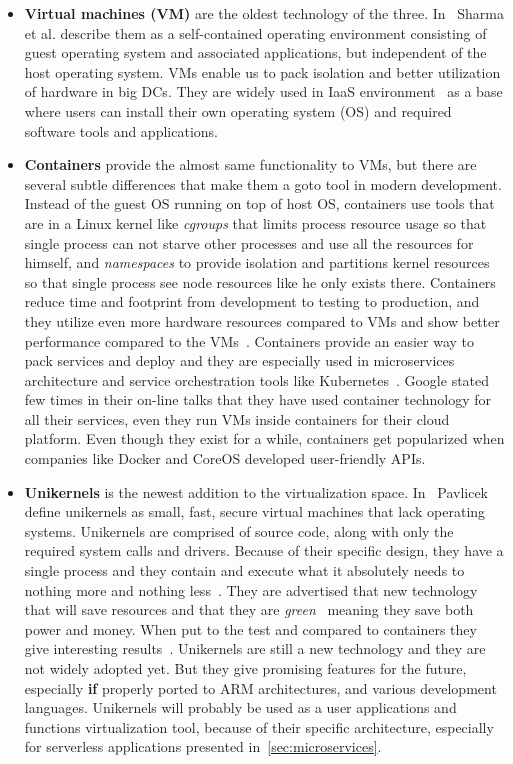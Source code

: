\begin{itemize}
	\item \textbf{Virtual machines (VM)} are the oldest technology of the three. In~\cite{Sharma} Sharma et al. describe them as a self-contained operating environment consisting of guest operating system and associated applications, but independent of the host operating system. VMs enable us to pack isolation and better utilization of hardware in big DCs. They are widely used in IaaS environment~\cite{AbsalomBJ13, YangHCLW13} as a base where users can install their own operating system (OS) and required software tools and applications.
	\item \textbf{Containers} provide the almost same functionality to VMs, but there are several subtle differences that make them a goto tool in modern development. Instead of the guest OS running on top of host OS, containers use tools that are in a Linux kernel like \textit{cgroups} that limits process resource usage so that single process can not starve other processes and use all the resources for himself, and \textit{namespaces} to provide isolation and partitions kernel resources so that single process see node resources like he only exists there. Containers reduce time and footprint from development to testing to production, and they utilize even more hardware resources compared to VMs and show better performance compared to the VMs~\cite{Seo2014PerformanceCA, FelterFRR15}. Containers provide an easier way to pack services and deploy and they are especially used in microservices architecture and service orchestration tools like Kubernetes~\cite{BurnsGOBW16}. Google stated few times in their on-line talks that they have used container technology for all their services, even they run VMs inside containers for their cloud platform. Even though they exist for a while, containers get popularized when companies like Docker and CoreOS developed user-friendly APIs.
	\item \textbf{Unikernels} is the newest addition to the virtualization space. In~\cite{pavlicek2016unikernels} Pavlicek define unikernels as small, fast, secure virtual machines that lack operating systems. Unikernels are comprised of source code, along with only the required system calls and drivers. Because of their specific design, they have a single process and they contain and execute what it absolutely needs to nothing more and nothing less~\cite{GoethalsSAVT18}. They are advertised that new technology that will save resources and that they are \textit{green}~\cite{208735} meaning they save both power and money. When put to the test and compared to containers they give interesting results~\cite{GoethalsSAVT18, PlauthFP17}. Unikernels are still a new technology and they are not widely adopted yet. But they give promising features for the future, especially \textbf{if} properly ported to ARM architectures, and various development languages. Unikernels will probably be used as a user applications and functions virtualization tool, because of their specific architecture, especially for serverless applications presented in~\ref{sec:microservices}.
\end{itemize}

